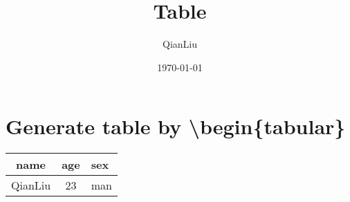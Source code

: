 \documentclass{article}
\author{QianLiu}
\title{Table}
\date{\today}
\begin{document}
    \tableofcontents
    \maketitle

    \section{Generate table by \textbackslash begin\{tabular\}}
    \begin{tabular}{|c||c|p{2cm}|}
        \hline
        name & age & sex\\
        \hline \hline
        QianLiu & 23 & man\\
        \hline
    \end{tabular}
\end{document}
